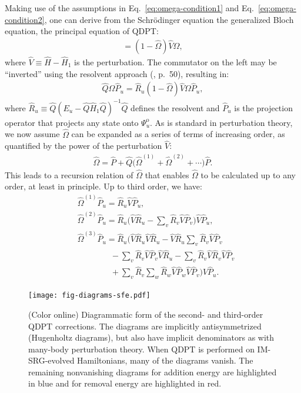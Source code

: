Making use of the assumptions in Eq.\ \eqref{eq:omega-condition1} and Eq.\ \eqref{eq:omega-condition2}, one can derive from the Schr\"odinger equation the generalized Bloch equation, the principal equation of QDPT:
\begin{gather*}
  [\hat \Omega, \hat{H}_1] =
  (1 - \hat \Omega) \hat V \Omega,
\end{gather*}
where $\hat V \equiv \hat H - \hat{H}_1$ is the perturbation.  The commutator on the left may be ``inverted'' using the resolvent approach (\cite{shavitt2009many}, p.\ 50), resulting in:
\begin{align*}
  \hat Q \Omega \hat P_u =
  \hat R_u (1 - \hat \Omega) \hat V \Omega \hat P_u,
\end{align*}
where $\hat R_u \equiv \hat Q (E_u - \hat Q \hat{H}_1 \hat Q)^{-1} \hat Q$ defines the resolvent and $\hat P_u$ is the projection operator that projects any state onto $\Psi^{\mathrm{o}}_u$.  As is standard in perturbation theory, we now assume $\hat \Omega$ can be expanded as a series of terms of increasing order, as quantified by the power of the perturbation $\hat V$:
\begin{align*}
  \hat \Omega = \hat P +
  \hat Q\bigl(\hat \Omega^{(1)} + \hat \Omega^{(2)} + \cdots\bigr) \hat P.
\end{align*}
This leads to a recursion relation of $\hat \Omega$ that enables $\hat \Omega$ to be calculated up to any order, at least in principle.  Up to third order, we have:
\begin{align*}
  &\hat \Omega^{(1)} \hat P_u = \hat R_u \hat V \hat P_u, \\
  &\hat \Omega^{(2)} \hat P_u =
    \hat R_u \biggl(
    \hat V \hat R_u
    - \sum_v \hat R_v \hat V \hat P_v
    \biggr) \hat V \hat P_u, \\
  &\hat \Omega^{(3)} \hat P_u =
    \hat R_u \biggl(
    \hat V \hat R_u \hat V \hat R_u
    - \hat V \hat R_u \sum_v \hat R_v \hat V \hat P_v \\
  &\qquad\qquad
    - \sum_v \hat R_v \hat V \hat P_v \hat V \hat R_u
    - \sum_v \hat R_v \hat V \hat R_v \hat V \hat P_v \\
  &\qquad\qquad
    + \sum_v \hat R_v \sum_w \hat R_w \hat V \hat P_w \hat V \hat P_v
    \biggr) \hat V \hat P_u.
\end{align*}

\begin{figure}
\texttt{[image: fig-diagrams-sfe.pdf]}
\caption{(Color online) Diagrammatic form of the second- and third-order QDPT corrections.  The diagrams are implicitly antisymmetrized (Hugenholtz diagrams), but also have implicit denominators as with many-body perturbation theory.  When QDPT is performed on IM-SRG-evolved Hamiltonians, many of the diagrams vanish.  The remaining nonvanishing diagrams for addition energy are highlighted in blue and for removal energy are highlighted in red.}
\label{fig:diagrams-sfe}
\end{figure}

